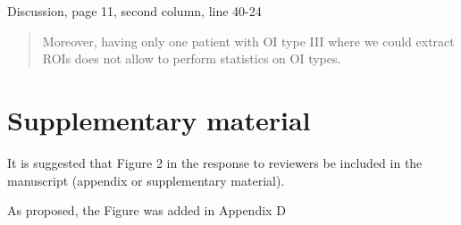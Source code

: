 \documentclass{AR2RC}
\begin{document}
Discussion, page 11, second column, line 40-24
\begin{quote}
	Moreover, having only one patient with OI type III where we could extract ROIs does not allow to perform statistics on OI types. 
\end{quote}

\section{Supplementary material}
\RC It is suggested that Figure 2 in the response to reviewers be included in the manuscript (appendix or supplementary material).

\AR As proposed, the Figure was added in Appendix D
\end{document}
